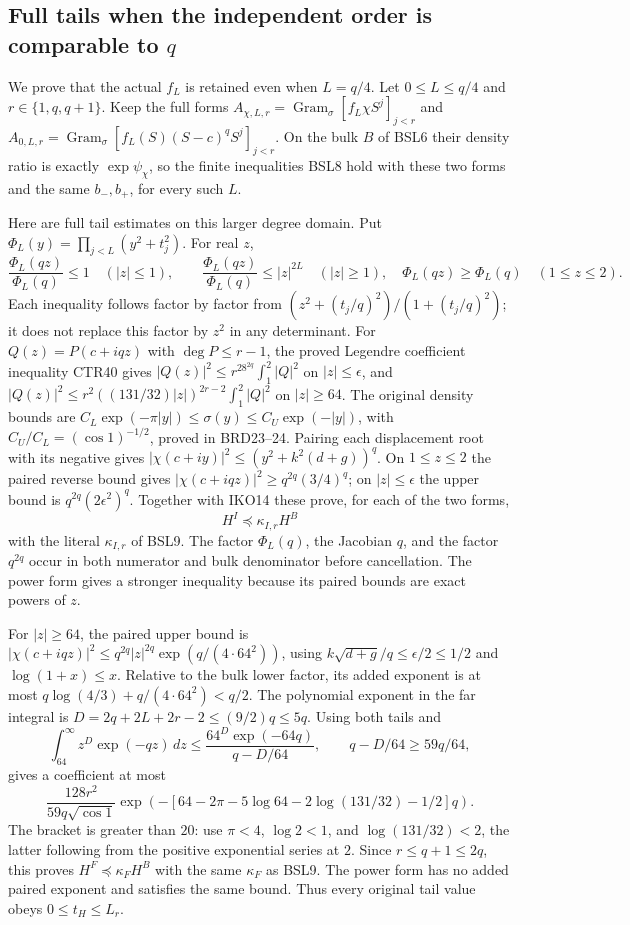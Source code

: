 \subsection{Full tails when the independent order is comparable to $q$}
We prove that the actual $f_L$ is retained even when $L=q/4$.
Let $0\leq L\leq q/4$ and $r\in\{1,q,q+1\}$. Keep the full forms
$A_{\chi,L,r}=\operatorname{Gram}_\sigma[f_L\chi S^j]_{j<r}$
and $A_{0,L,r}=\operatorname{Gram}_\sigma[f_L(S)(S-c)^qS^j]_{j<r}$.
On the bulk $B$ of BSL6 their density ratio is exactly
$\exp\psi_\chi$, so the finite inequalities BSL8 hold with these
two forms and the same $b_-,b_+$, for every such $L$.

Here are full tail estimates on this larger degree domain. Put
$\Phi_L(y)=\prod_{j<L}(y^2+t_j^2)$. For real $z$,
\[
 \frac{\Phi_L(qz)}{\Phi_L(q)}\leq1\quad(|z|\leq1),\qquad
 \frac{\Phi_L(qz)}{\Phi_L(q)}\leq|z|^{2L}\quad(|z|\geq1),
 \quad\Phi_L(qz)\geq\Phi_L(q)\quad(1\leq z\leq2).
 \tag{IKO14}
\]
Each inequality follows factor by factor from
$(z^2+(t_j/q)^2)/(1+(t_j/q)^2)$; it does not replace this factor
by $z^2$ in any determinant.
For $Q(z)=P(c+iqz)$ with $\deg P\leq r-1$, the proved Legendre
coefficient inequality CTR40 gives
$|Q(z)|^2\leq r^28^{2q}\int_1^2|Q|^2$ on $|z|\leq\epsilon$,
and $|Q(z)|^2\leq r^2((131/32)|z|)^{2r-2}\int_1^2|Q|^2$
on $|z|\geq64$. The original density bounds are
$C_L\exp(-\pi|y|)\leq\sigma(y)\leq C_U\exp(-|y|)$,
with $C_U/C_L=(\cos1)^{-1/2}$, proved in BRD23--24.
Pairing each displacement root with its negative gives
$|\chi(c+iy)|^2\leq(y^2+k^2(d+g))^q$.
On $1\leq z\leq2$ the paired reverse bound gives
$|\chi(c+iqz)|^2\geq q^{2q}(3/4)^q$; on $|z|\leq\epsilon$
the upper bound is $q^{2q}(2\epsilon^2)^q$.
Together with IKO14 these prove, for each of the two forms,
\[
 H^I\preceq\kappa_{I,r}H^B
 \tag{IKO15}
\]
with the literal $\kappa_{I,r}$ of BSL9. The factor
$\Phi_L(q)$, the Jacobian $q$, and the factor $q^{2q}$ occur in
both numerator and bulk denominator before cancellation. The power
form gives a stronger inequality because its paired bounds are exact
powers of $z$.

For $|z|\geq64$, the paired upper bound is
$|\chi(c+iqz)|^2\leq q^{2q}|z|^{2q}\exp(q/(4\cdot64^2))$,
using $k\sqrt{d+g}/q\leq\epsilon/2\leq1/2$ and
$\log(1+x)\leq x$. Relative to the bulk lower factor, its added
exponent is at most
$q\log(4/3)+q/(4\cdot64^2)<q/2$.
The polynomial exponent in the far integral is
$D=2q+2L+2r-2\leq(9/2)q\leq5q$.
Using both tails and
\[
 \int_{64}^{\infty}z^D\exp(-qz)\,dz
 \leq\frac{64^D\exp(-64q)}{q-D/64},\qquad q-D/64\geq59q/64,
\]
gives a coefficient at most
\[
 \frac{128r^2}{59q\sqrt{\cos1}}
 \exp\left(-[64-2\pi-5\log64-2\log(131/32)-1/2]q\right).
\]
The bracket is greater than $20$: use $\pi<4$, $\log2<1$,
and $\log(131/32)<2$, the latter following from the positive
exponential series at $2$. Since $r\leq q+1\leq2q$, this proves
$H^F\preceq\kappa_FH^B$ with the same $\kappa_F$ as BSL9.
The power form has no added paired exponent and satisfies the same
bound. Thus every original tail value obeys $0\leq t_H\leq L_r$.

